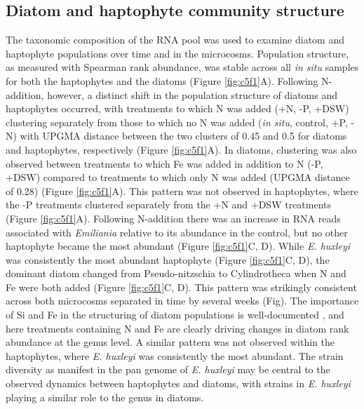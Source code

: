 \subsection{Diatom and haptophyte community structure}

The taxonomic composition of the RNA pool was used to examine diatom and haptophyte populations over time and in the microcosms. Population structure, as measured with Spearman rank abundance, was stable across all \textit{in situ} samples for both the haptophytes and the diatoms (Figure \ref{fig:c5f1}A). Following N-addition, however, a distinct shift in the population structure of diatoms and haptophytes occurred, with treatments to which N was added (+N, -P, +DSW) clustering separately from those to which no N was added (\textit{in situ}, control, +P, -N) with UPGMA distance between the two clusters of 0.45 and 0.5 for diatoms and haptophytes, respectively (Figure \ref{fig:c5f1}A). In diatoms, clustering was also observed between treatments to which Fe was added in addition to N (-P, +DSW) compared to treatments to which only N was added (UPGMA distance of 0.28) (Figure \ref{fig:c5f1}A). This pattern was not observed in haptophytes, where the -P treatments clustered separately from the +N and +DSW treatments (Figure \ref{fig:c5f1}A). Following N-addition there was an increase in RNA reads associated with \textit{Emiliania} relative to its abundance in the control, but no other haptophyte became the most abundant (Figure \ref{fig:c5f1}C, D). While \textit{E. huxleyi} was consistently the most abundant haptophyte (Figure \ref{fig:c5f1}C, D), the dominant diatom changed from Pseudo-nitzschia to Cylindrotheca when N and Fe were both added (Figure \ref{fig:c5f1}C, D). This pattern was strikingly consistent across both microcosms separated in time by several weeks (Fig). The importance of Si and Fe in the structuring of diatom populations is well-documented \citep{Marchetti2005, Marchetti2012a}, and here treatments containing N and Fe are clearly driving changes in diatom rank abundance at the genus level. A similar pattern was not observed within the haptophytes, where \textit{E. huxleyi} was consistently the most abundant. The strain diversity as manifest in the pan genome of \textit{E. huxleyi} \citep{Read2013} may be central to the observed dynamics between haptophytes and diatoms, with strains in \textit{E. huxleyi} playing a similar role to the genus in diatoms.\par

